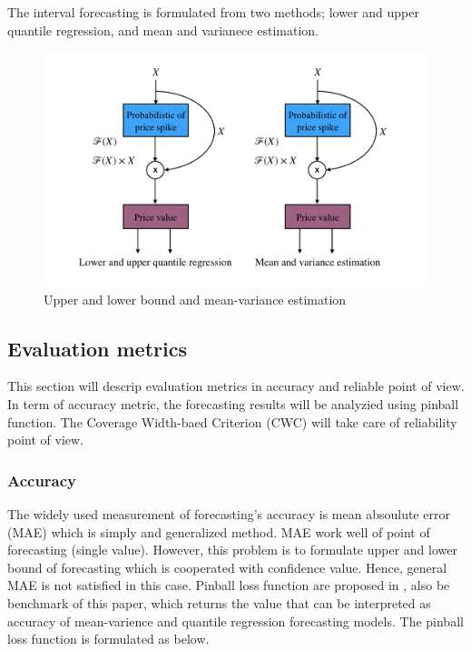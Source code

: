 \documentclass[review]{elsarticle}
\begin{document}
      The interval forecasting is formulated from two methods; lower and upper quantile regression, and mean and varianece estimation.
      \begin{figure}[H]
        \includegraphics[width=12cm]{UB_LB_MV_PDRNN}
        \caption{Upper and lower bound and mean-variance estimation}
        \label{Fig:UB_LB_MV_PDRNN}
        \centering
      \end{figure}

    \subsection{Evaluation metrics}
      This section will descrip evaluation metrics in accuracy and reliable point of view.
      In term of accuracy metric, the forecasting results will be analyzied using pinball function.
      The Coverage Width-baed Criterion (CWC) will take care of reliability point of view.

      \subsubsection{Accuracy}
        The widely used measurement of forecasting's accuracy is mean absoulute error (MAE) which is simply and generalized method.
        MAE work well of point of forecasting (single value).
        However, this problem is to formulate upper and lower bound of forecasting which is cooperated with confidence value.
        Hence, general MAE is not satisfied in this case.
        Pinball loss function are proposed in \cite{Maciejowska2016}, also be benchmark of this paper, which returns the value that can be interpreted as accuracy of mean-varience and quantile regression forecasting models.
        The pinball loss function is formulated as below.
\end{document}
